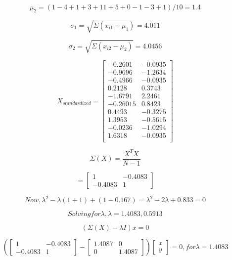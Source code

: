 \documentclass{report}
\begin{document}
\begin{flushleft}
\begin{equation}
\mu_2 = (1 -4 + 1 + 3 + 11 + 5 + 0 - 1 -3 + 1) / 10 = 1.4
\end{equation}

\begin{equation}
\sigma_1 = \sqrt{\Sigma (x_{i1} - \mu_1) } = 4.011
\end{equation}

\begin{equation}
\sigma_2 = \sqrt{\Sigma (x_{i2} - \mu_2) } = 4.0456
\end{equation}

\begin{equation}
X_{standardized} = \begin{bmatrix}
-0.2601 & -0.0935 \\
-0.9696 & -1.2634 \\
-0.4966 & -0.0935 \\
0.2128 & 0.3743 \\
-1.6791 & 2.2461 \\
-0.26015 & 0.8423 \\
0.4493 & -0.3275 \\
1.3953 & -0.5615 \\
-0.0236 & -1.0294 \\
1.6318 & -0.0935 \\
\end{bmatrix}
\end{equation}

\begin{equation}
\Sigma(X) = \frac{X^TX}{N-1}  
\end{equation}

\[=\begin{bmatrix}
1 & -0.4083 \\
-0.4083 & 1
\end{bmatrix}\]

\begin{equation}
Now, \lambda^2 - \lambda(1+1) + (1-0.167) = \lambda^2 - 2\lambda + 0.833 = 0
\end{equation}

\[
Solving for \lambda, \lambda = 1.4083, 0.5913
\]

\begin{equation}
(\Sigma (X) - \lambda I)x = 0
\end{equation}

\begin{equation}
(\begin{bmatrix}
1 & -0.4083 \\
-0.4083 & 1
\end{bmatrix} - 
\begin{bmatrix}
1.4087 & 0 \\
0 & 1.4087
\end{bmatrix})
\begin{bmatrix}
x \\
y
\end{bmatrix}
= 0, for \lambda = 1.4083
\end{equation} \\


\end{flushleft}
\end{document}
